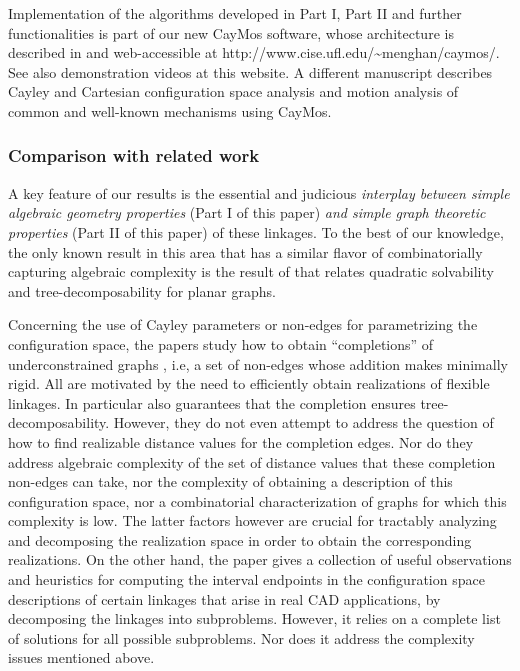 \documentclass[secthm,amsthm,english]{article}
\theoremstyle{definition}
\theoremstyle{remark}
\begin{document}
\bigskip
\noindent 
Implementation of the algorithms developed in Part I, Part II and further functionalities is part of our new CayMos software,
whose architecture is described in \cite{bib:caymos} and 
web-accessible at http://www.cise.ufl.edu/\~{}menghan/caymos/. 
See also demonstration videos at this website.
A different manuscript \cite{bib:beest} describes Cayley and Cartesian configuration space analysis and motion analysis 
of common and well-known mechanisms using CayMos.


\subsubsection{Comparison with related work}

A key feature of our results is the essential and judicious \emph{interplay
between simple algebraic geometry properties} (Part I of this paper)
\emph{and simple graph theoretic properties} (Part II of this paper)
of these linkages.
To the best of our knowledge, the only known result in this area that has a similar flavor
of combinatorially capturing algebraic complexity is the result of \cite{bib:Owen02} that relates quadratic
solvability and tree-decomposability for planar graphs.

Concerning the use of Cayley parameters or non-edges for parametrizing the configuration
space, the papers \cite{bib:JoanArinyo03,bib:survey,bib:ZhangGao06} study how to obtain ``completions'' 
of underconstrained
graphs , i.e, a set of non-edges  whose addition makes  minimally rigid. 
All are motivated by the need to efficiently obtain realizations of flexible linkages. 
In particular \cite{bib:JoanArinyo03} also guarantees that the completion ensures tree-decomposability.
However, they do not even attempt to address the question of how to find realizable
distance values for the completion edges. Nor do they address
algebraic complexity of the set of distance values that these completion non-edges
can take, nor the complexity of obtaining a description of this configuration space,
nor a combinatorial characterization of graphs
for which this complexity is low. 
The latter factors however are crucial for tractably analyzing and decomposing 
the realization space in order to obtain the corresponding realizations. 
On the other hand, 
the paper \cite{bib:hilderick06} gives a collection of useful observations and heuristics for computing
the interval endpoints in the configuration space descriptions of certain linkages that
arise in real CAD applications, by decomposing the linkages into subproblems.
However, it relies on a complete list of solutions for all possible subproblems.
Nor does it address the complexity issues mentioned above.
\end{document}
